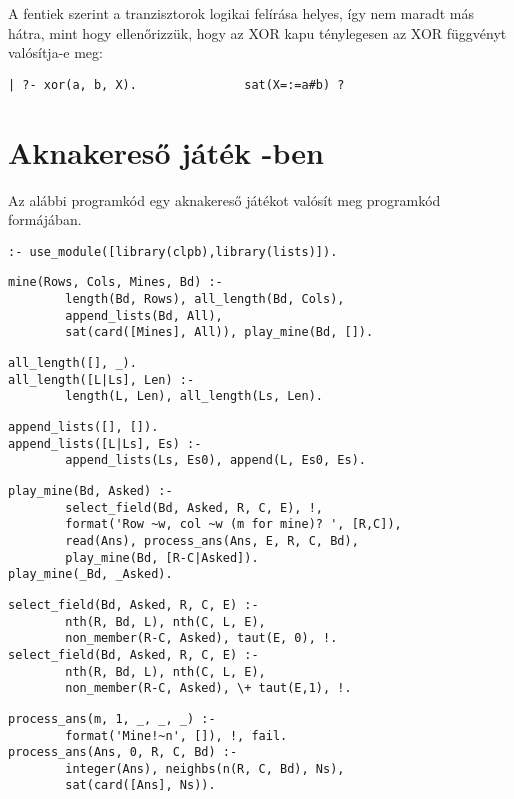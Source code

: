 A fentiek szerint a tranzisztorok logikai felírása helyes, így nem
maradt más hátra, mint hogy ellenőrizzük, hogy az XOR kapu ténylegesen
az XOR függvényt valósítja-e meg:

\begin{verbatim}
| ?- xor(a, b, X).               sat(X=:=a#b) ?
\end{verbatim}

\section{Aknakereső játék \Clpb -ben}

Az alábbi programkód egy aknakereső játékot valósít meg \clpb programkód
formájában.

\begin{verbatim}
:- use_module([library(clpb),library(lists)]).
\end{verbatim}
\begin{verbatim}
mine(Rows, Cols, Mines, Bd) :-
        length(Bd, Rows), all_length(Bd, Cols), 
        append_lists(Bd, All),
        sat(card([Mines], All)), play_mine(Bd, []).
\end{verbatim}
\begin{verbatim}
all_length([], _).
all_length([L|Ls], Len) :- 
        length(L, Len), all_length(Ls, Len).
\end{verbatim}
\begin{verbatim}
append_lists([], []).
append_lists([L|Ls], Es) :-
        append_lists(Ls, Es0), append(L, Es0, Es).
\end{verbatim}
\begin{verbatim}
play_mine(Bd, Asked) :- 
        select_field(Bd, Asked, R, C, E), !,
        format('Row ~w, col ~w (m for mine)? ', [R,C]), 
        read(Ans), process_ans(Ans, E, R, C, Bd), 
        play_mine(Bd, [R-C|Asked]).
play_mine(_Bd, _Asked).
\end{verbatim}
\begin{verbatim}
select_field(Bd, Asked, R, C, E) :-
        nth(R, Bd, L), nth(C, L, E), 
        non_member(R-C, Asked), taut(E, 0), !.
select_field(Bd, Asked, R, C, E) :-
        nth(R, Bd, L), nth(C, L, E), 
        non_member(R-C, Asked), \+ taut(E,1), !.
\end{verbatim}
\begin{verbatim}
process_ans(m, 1, _, _, _) :- 
        format('Mine!~n', []), !, fail.
process_ans(Ans, 0, R, C, Bd) :-
        integer(Ans), neighbs(n(R, C, Bd), Ns), 
        sat(card([Ans], Ns)).
\end{verbatim}
